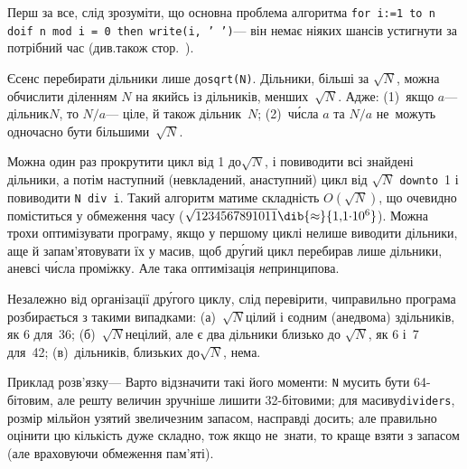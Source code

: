 \Tutorial	Перш за все, слід зрозуміти, що основна проблема алгоритма \texttt{for \mbox{i:=1 to n} do\linebreak[2] if \mbox{n mod i = 0} then \mbox{write(i, ' ')}}\nolinebreak[3] --- він не\nolinebreak[3] має ніяких шансів устигнути за потрібний час (див.\nolinebreak[3] також стор.~\pageref{text:first-example-how-to-see-algo-will-not-fit-in-time-limit}).

\label{text:about-sqrt-n-in-divisors-list}
Є\nolinebreak[3] сенс перебирати дільники лише до\nolinebreak[2] \verb"sqrt(N)". Дільники, більші за $\sqrt{N}$, можна обчислити діленням $N$ на якийсь із дільників, менших~$\sqrt{N}$. Адже: (1)~якщо $a$\nolinebreak[3] --- дільник\nolinebreak[3] $N$, то $N/a$\nolinebreak[3] --- ціле, й також дільник~$N$; (2)~ч\'{и}сла $a$ та $N/a$ не~можуть одночасно бути більшими~$\sqrt{N}$. 

Можна один раз прокрутити цикл від 1 до\nolinebreak[3] $\sqrt{N}$, і повиводити всі знайдені дільники, а потім наступний (не\nolinebreak[3] вкладений, а\nolinebreak[3] наступний) цикл від $\sqrt{N}$ \texttt{downto}~1 і повиводити \verb"N div i". Такий алгоритм матиме складність $O(\sqrt{N})$, що очевидно поміститься у обмеження часу ($\sqrt{1234567891011}\dib{{\approx}}{1{,}1{\cdot}10^6}$). Можна трохи оптимізувати програму, якщо у першому циклі не\nolinebreak[3] лише виводити дільники, а\nolinebreak[3] ще й запам'ятовувати їх у масив, щоб др\'{у}гий цикл перебирав лише дільники, а\nolinebreak[3] не\nolinebreak[3] всі ч\'{и}сла проміжку. Але така оптимізація \emph{не}\nolinebreak[3] принципова.

Незалежно від %
організації др\'{у}гого циклу, 
слід
перевірити, чи\nolinebreak[3] правильно програма розбирається з такими випадками: (а)~$\sqrt{N}$\nolinebreak[1] цілий і є\nolinebreak[2] одним (а\nolinebreak[3] не\nolinebreak[3] двома) з\nolinebreak[2] дільників, як 6 для~36;
(б)~$\sqrt{N}$\nolinebreak[1] не\nolinebreak[3] цілий, але є два дільники близько до $\sqrt{N}$, як 6 і~7 для~42;
(в)~дільників, близьких до\nolinebreak[3] $\sqrt{N}$, нема.

Приклад розв'язку\nolinebreak[3] --- \hspace{0.5emplus 1em}
Варто відзначити такі його моменти: \texttt{N} мусить бути 64-\nolinebreak[3]бітовим, але решту величин зручніше лишити 32-\nolinebreak[3]бітовими;
для масиву\nolinebreak[3] \texttt{dividers}, розмір мільйон узятий з\nolinebreak[3] величезним запасом, насправді досить; але правильно оцінити цю кількість дуже складно, тож якщо не~знати, то краще взяти з запасом (але враховуючи обмеження пам'яті).